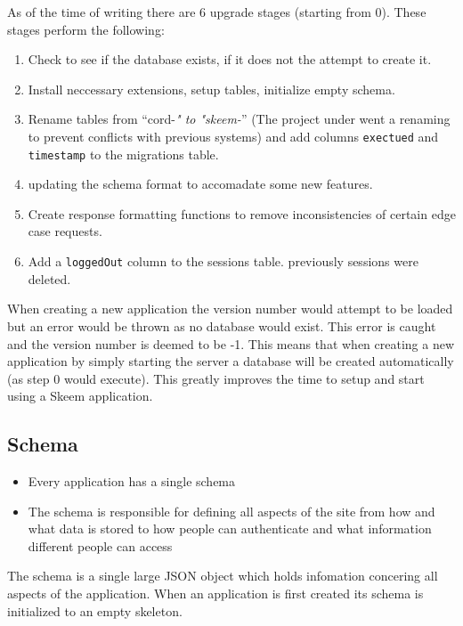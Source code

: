 \documentclass[
  12pt,
]{article}
\newcommand{\passthrough}[1]{#1}
\providecommand{\tightlist}{%
  \setlength{\itemsep}{0pt}\setlength{\parskip}{0pt}}
\begin{document}
As of the time of writing there are 6 upgrade stages (starting from 0).
These stages perform the following:

\begin{enumerate}
\def\labelenumi{\arabic{enumi}.}
\setcounter{enumi}{-1}
\tightlist
\item
  Check to see if the database exists, if it does not the attempt to
  create it.
\item
  Install neccessary extensions, setup tables, initialize empty schema.
\item
  Rename tables from ``cord-\emph{" to "skeem-}'' (The project under
  went a renaming to prevent conflicts with previous systems) and add
  columns \passthrough{\lstinline!exectued!} and
  \passthrough{\lstinline!timestamp!} to the migrations table.
\item
  updating the schema format to accomadate some new features.
\item
  Create response formatting functions to remove inconsistencies of
  certain edge case requests.
\item
  Add a \passthrough{\lstinline!loggedOut!} column to the sessions
  table. previously sessions were deleted.
\end{enumerate}

When creating a new application the version number would attempt to be
loaded but an error would be thrown as no database would exist. This
error is caught and the version number is deemed to be -1. This means
that when creating a new application by simply starting the server a
database will be created automatically (as step 0 would execute). This
greatly improves the time to setup and start using a Skeem application.

\hypertarget{schema}{%
\subsection{Schema}\label{schema}}

\begin{itemize}
\tightlist
\item
  Every application has a single schema
\item
  The schema is responsible for defining all aspects of the site from
  how and what data is stored to how people can authenticate and what
  information different people can access
\end{itemize}

The schema is a single large JSON object which holds infomation
concering all aspects of the application. When an application is first
created its schema is initialized to an empty skeleton.
\end{document}
